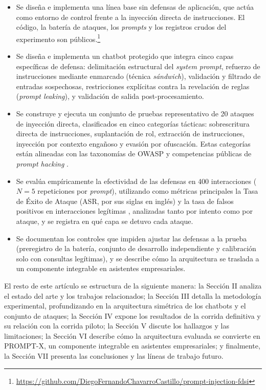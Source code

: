 \documentclass[twocolumn]{article}
\begin{document}
\begin{itemize}
    \item Se diseña e implementa una línea base sin defensas de aplicación, que actúa como entorno de control frente a la inyección directa de instrucciones.
    El código, la batería de ataques, los \textit{prompts} y los registros crudos del experimento son públicos.\footnote{\url{https://github.com/DiegoFernandoChavarroCastillo/prompt-injection-fdsi}}
    \item Se diseña e implementa un chatbot protegido que integra cinco capas específicas de defensa: delimitación estructural del \textit{system prompt}, refuerzo de instrucciones mediante enmarcado (técnica \textit{sándwich}), validación y filtrado de entradas sospechosas, restricciones explícitas contra la revelación de reglas (\textit{prompt leaking}), y validación de salida post-procesamiento.
    \item Se construye y ejecuta un conjunto de pruebas representativo de 20 ataques de inyección directa, clasificados en cinco categorías tácticas: sobrescritura directa de instrucciones, suplantación de rol, extracción de instrucciones, inyección por contexto engañoso y evasión por ofuscación. Estas categorías están alineadas con las taxonomías de OWASP \cite{ref3} y competencias públicas de \textit{prompt hacking} \cite{ref10}.
    \item Se evalúa empíricamente la efectividad de las defensas en 400 interacciones ($N=5$ repeticiones por \textit{prompt}), utilizando como métricas principales la Tasa de Éxito de Ataque (ASR, por sus siglas en inglés) y la tasa de falsos positivos en interacciones legítimas \cite{ref5}, analizadas tanto por intento como por ataque, y se registra en qué capa se detuvo cada ataque.
    \item Se documentan los controles que impiden ajustar las defensas a la prueba (preregistro de la batería, conjunto de desarrollo independiente y calibración solo con consultas legítimas), y se describe cómo la arquitectura se traslada a un componente integrable en asistentes empresariales.
\end{itemize}

El resto de este artículo se estructura de la siguiente manera: la Sección II analiza el estado del arte y los trabajos relacionados; la Sección III detalla la metodología experimental, profundizando en la arquitectura simétrica de los chatbots y el conjunto de ataques; la Sección IV expone los resultados de la corrida definitiva y su relación con la corrida piloto; la Sección V discute los hallazgos y las limitaciones; la Sección VI describe cómo la arquitectura evaluada se convierte en PROMPT-X, un componente integrable en asistentes empresariales; y finalmente, la Sección VII presenta las conclusiones y las líneas de trabajo futuro.
\end{document}
